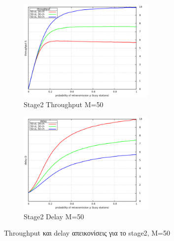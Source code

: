 \documentclass[12pt]{report}
\begin{document}
\begin{figure}[h]
\begin{subfigure}{0.5\textwidth}
\includegraphics[width=0.9\linewidth, height=5cm]{st2_throughput_M50} 
\caption{\textlatin{Stage2 Throughput M=50}}
\label{fig:st2_throughput_50}
\end{subfigure}
\begin{subfigure}{0.5\textwidth}
\includegraphics[width=0.9\linewidth, height=5cm]{st2_delay_M50}
\caption{\textlatin{Stage2 Delay M=50}}
\label{fig:st2_delay_50}
\end{subfigure}
 
\caption{\textlatin{Throughput} και \textlatin{delay} απεικονίσεις για το \textlatin{stage2}, M=50}
\label{fig:Stage2_50}
\end{figure}
\end{document}
